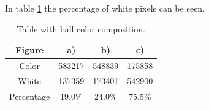 In table \ref{fig:ballscompotable} the percentage of white pixels can be seen.

\begin{table}[htpb]
\centering
\begin{tabular}{|c|c|c|c|}
	\hline Figure & a) & b) & c) \\ 
	\hline Color & 583217 & 548839 & 175858 \\ 
	\hline White & 137359 & 173401 & 542900 \\ 
	\hline Percentage & 19.0\% & 24.0\% & 75.5\% \\ 
	\hline
\end{tabular}
\caption{Table with ball color composition.}
\label{fig:ballscompotable}
\end{table}
